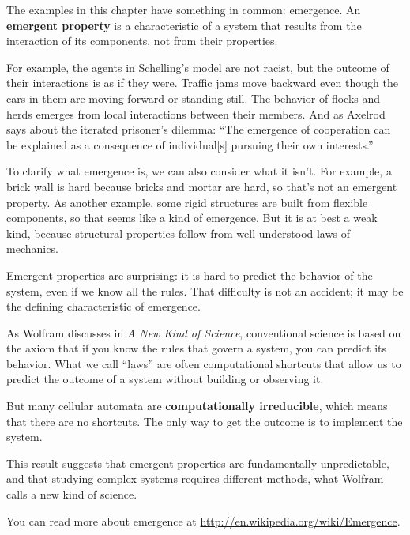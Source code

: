 \documentclass[10pt]{book}
\begin{document}
The examples in this chapter have something in common: emergence.  An
{\bf emergent property} is a characteristic of a system that results
from the interaction of its components, not from their properties.

For example, the agents in Schelling's model are not racist, but the
outcome of their interactions is as if they were.  Traffic jams move
backward even though the cars in them are moving forward or standing
still.  The behavior of flocks and herds emerges from local
interactions between their members.  And as Axelrod says about the
iterated prisoner's dilemma: ``The emergence of cooperation can be
explained as a consequence of individual[s] pursuing their own
interests.''

To clarify what emergence is, we can also consider what it isn't.  For
example, a brick wall is hard because bricks and mortar are hard, so
that's not an emergent property.  As another example, some rigid
structures are built from flexible components, so that seems like
a kind of emergence.  But it is at best a weak kind,
because structural properties follow from well-understood laws of
mechanics.

Emergent properties are surprising: it is hard to predict the behavior
of the system, even if we know all the rules.  That difficulty is not
an accident; it may be the defining characteristic of emergence.

As Wolfram discusses in {\em A New Kind of Science}, conventional science
is based on the axiom that if you know the rules that govern a system,
you can predict its behavior.  What we call ``laws'' are often
computational shortcuts that allow us to predict the outcome of a
system without building or observing it.

But many cellular automata are {\bf computationally irreducible},
which means that there are no shortcuts.  The only way to get the
outcome is to implement the system.

This result suggests that emergent properties are fundamentally
unpredictable, and that studying complex systems requires different
methods, what Wolfram calls a new kind of science.

You can read more about emergence at
\url{http://en.wikipedia.org/wiki/Emergence}.


\end{document}

